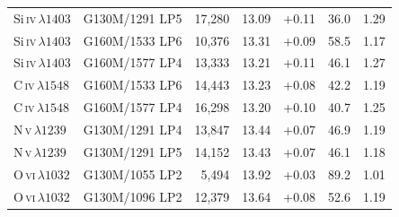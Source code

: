\begin{table}[h]
\begin{tabular}{llrrrrr}
Si\,\textsc{iv}\,$\lambda1403$ & G130M/1291 LP5 & 17{,}280 & 13.09 & +0.11 & 36.0 & 1.29 \\
Si\,\textsc{iv}\,$\lambda1403$ & G160M/1533 LP6 & 10{,}376 & 13.31 & +0.09 & 58.5 & 1.17 \\
Si\,\textsc{iv}\,$\lambda1403$ & G160M/1577 LP4 & 13{,}333 & 13.21 & +0.11 & 46.1 & 1.27 \\
C\,\textsc{iv}\,$\lambda1548$ & G160M/1533 LP6 & 14{,}443 & 13.23 & +0.08 & 42.2 & 1.19 \\
C\,\textsc{iv}\,$\lambda1548$ & G160M/1577 LP4 & 16{,}298 & 13.20 & +0.10 & 40.7 & 1.25 \\
N\,\textsc{v}\,$\lambda1239$ & G130M/1291 LP4 & 13{,}847 & 13.44 & +0.07 & 46.9 & 1.19 \\
N\,\textsc{v}\,$\lambda1239$ & G130M/1291 LP5 & 14{,}152 & 13.43 & +0.07 & 46.1 & 1.18 \\
O\,\textsc{vi}\,$\lambda1032$ & G130M/1055 LP2 & 5{,}494 & 13.92 & +0.03 & 89.2 & 1.01 \\
O\,\textsc{vi}\,$\lambda1032$ & G130M/1096 LP2 & 12{,}379 & 13.64 & +0.08 & 52.6 & 1.19 \\
\bottomrule
\end{tabular}
\end{table}
